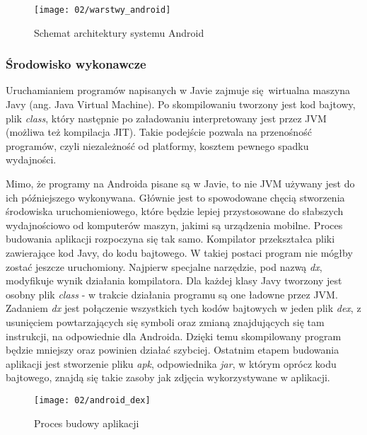 \begin{figure}[h]
	\begin{center}
		\texttt{[image: 02/warstwy\_android]}
	\end{center}
	\caption{Schemat architektury systemu Android}
\end{figure}

\subsubsection*{Środowisko wykonawcze}
Uruchamianiem programów napisanych w Javie zajmuje się wirtualna maszyna Javy (ang. Java Virtual Machine). Po skompilowaniu tworzony jest kod bajtowy, plik \textit{class}, który następnie po załadowaniu interpretowany jest przez JVM (możliwa też kompilacja JIT). Takie podejście pozwala na przenośność programów, czyli niezależność od platformy, kosztem pewnego spadku wydajności.

Mimo, że programy na Androida pisane są w Javie, to nie JVM używany jest do ich późniejszego wykonywana. Głównie jest to spowodowane chęcią stworzenia środowiska uruchomieniowego, które będzie lepiej przystosowane do słabszych wydajnościowo od komputerów maszyn, jakimi są urządzenia mobilne. Proces budowania aplikacji rozpoczyna się tak samo. Kompilator przekształca pliki zawierające kod Javy, do kodu bajtowego. W takiej postaci program nie mógłby zostać jeszcze uruchomiony. Najpierw specjalne narzędzie, pod nazwą \textit{dx}, modyfikuje wynik działania kompilatora. Dla każdej klasy Javy tworzony jest osobny plik \textit{class} - w trakcie działania programu są one ładowne przez JVM. Zadaniem \textit{dx} jest połączenie wszystkich tych kodów bajtowych w jeden plik \textit{dex}, z usunięciem powtarzających się symboli oraz zmianą znajdujących się tam instrukcji, na odpowiednie dla Androida. Dzięki temu skompilowany program będzie mniejszy oraz powinien działać szybciej. Ostatnim etapem budowania aplikacji jest stworzenie pliku \textit{apk}, odpowiednika \textit{jar}, w którym oprócz kodu bajtowego, znajdą się takie zasoby jak zdjęcia wykorzystywane w aplikacji.

\begin{figure}[h]
	\begin{center}
		\texttt{[image: 02/android\_dex]}
	\end{center}
	\caption{Proces budowy aplikacji}
	\vspace{-0.5cm}
\end{figure}

